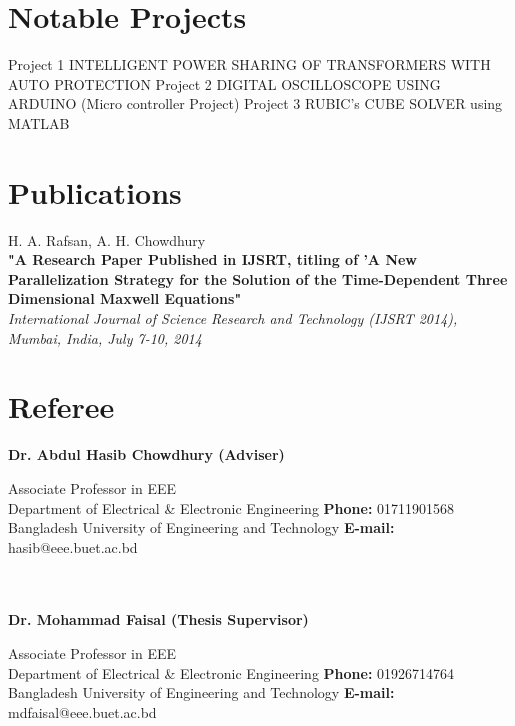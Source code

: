 \documentclass[]{friggeri-cv}
\begin{document}
\section{Notable Projects}
\begin{entrylist}
  \entry
    {Project 1}
    {INTELLIGENT POWER SHARING OF TRANSFORMERS WITH AUTO PROTECTION}
    { }
    { }
  \entry
    {Project 2}
    {DIGITAL OSCILLOSCOPE USING ARDUINO (Micro controller Project)}
    { }
    { }
  \entry
    {Project 3}
    {RUBIC's CUBE SOLVER using MATLAB}
    { }
    { }    
\end{entrylist}

\section{Publications}
H. A. Rafsan, A. H. Chowdhury\\
\textbf{"A Research Paper Published in IJSRT, titling of 'A New Parallelization Strategy for the Solution of the Time-Dependent Three Dimensional Maxwell Equations"}\\
\emph{International Journal of Science Research and Technology (IJSRT 2014), Mumbai, India, July 7-10, 2014}
\\

\section{Referee}

\textbf{Dr. Abdul Hasib Chowdhury (Adviser)}
\begin{innerlist}
\item[] Associate Professor in EEE \\
Department of Electrical \& Electronic Engineering \hfill {\textbf{Phone:} 01711901568}\\
Bangladesh University of Engineering and Technology \hfill{\textbf{E-mail:} hasib@eee.buet.ac.bd}\\
\end{innerlist}

\\
\\

\textbf{Dr. Mohammad Faisal (Thesis Supervisor)}
\begin{innerlist}
\item[] Associate Professor in EEE \\
Department of Electrical \& Electronic Engineering \hfill {\textbf{Phone:} 01926714764}\\
Bangladesh University of Engineering and Technology \hfill{\textbf{E-mail:} mdfaisal@eee.buet.ac.bd}\\
\end{innerlist}
\end{document}
